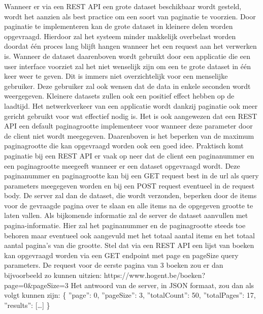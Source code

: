 Wanneer er via een REST API een grote dataset beschikbaar wordt gesteld, wordt het aanzien als best practice om een soort van paginatie te voorzien. Door paginatie te
implementeren kan de grote dataset in kleinere delen worden opgevraagd. Hierdoor zal het systeem minder makkelijk overbelast worden doordat \'e\'en proces lang blijft
hangen wanneer het een request aan het verwerken is. Wanneer de dataset daarenboven wordt gebruikt door een applicatie die een user interface voorziet zal het
niet wenselijk zijn om een te grote dataset in één keer weer te geven. Dit is immers niet overzichtelijk voor een menselijke gebruiker.
Deze gebruiker zal ook wensen dat de data in enkele seconden wordt weergegeven. Kleinere datasets zullen ook een positief effect hebben op de laadtijd.
Het netwerkverkeer van een applicatie wordt dankzij paginatie ook meer gericht gebruikt voor wat effectief nodig is. Het is ook aangewezen dat een REST API een
default paginagrootte implementeer voor wanneer deze parameter door de client niet wordt meegegeven. Daarenboven is het beperken van de maximum paginagrootte die
kan opgevraagd worden ook een goed idee.\newline
Praktisch komt paginatie bij een REST API er vaak op neer dat de client een paginanummer en een paginagrootte meegeeft wanneer er een dataset opgevraagd wordt.
Deze paginanummer en paginagrootte kan bij een GET request best in de url als query parameters meegegeven worden en bij een POST request eventueel in de request body.
De server zal dan de dataset, die wordt verzonden, beperken door de items voor de gevraagde pagina over te slaan en alle items na de opgegeven grootte te laten vallen.
Als bijkomende informatie zal de server de dataset aanvullen met pagina-informatie. Hier zal het paginanummer en de paginagrootte steeds toe behoren maar eventueel
ook aangevuld met het totaal aantal items en het totaal aantal pagina's van die grootte.
Stel dat via een REST API een lijst van boeken kan opgevraagd worden via een GET endpoint met page en pageSize query parameters. De request voor de eerste pagina
van 3 boeken zou er dan bijvoorbeeld zo kunnen uitzien:\newline
https://www.hogent.be/boeken?page=0\&pageSize=3
Het antwoord van de server, in JSON formaat, zou dan als volgt kunnen zijn:\newline
\{
''page'': 0,
''pageSize'': 3,
''totalCount'': 50,
''totalPages'': 17,
''results'': [\ldots]
\}\newline
~\autocite{paging}\\
~\autocite{wachtenLaadtijd}\\


